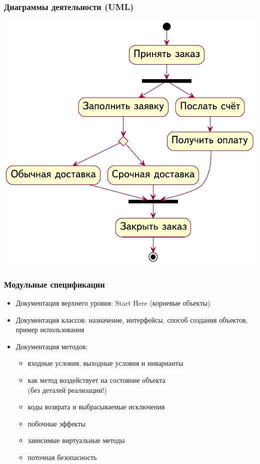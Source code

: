 \documentclass{softengineering-lectures}
\begin{document}
\begin{frame} \frametitle{Диаграммы деятельности (UML)}

  \centerline{\includegraphics[height=0.9\textheight]{activity.pdf}}

\end{frame}

\begin{frame} \frametitle{Модульные спецификации}
  \begin{itemize}
  \item Документация верхнего уровня: Start Here (корневые объекты)
  \item Документация классов: назначение, интерфейсы, способ создания объектов,
    пример использования
  \item Документация методов:
    \begin{itemize}
    \item входные условия, выходные условия и инварианты
    \item как метод воздействует на состояние объекта\\ (без деталей реализации!)
    \item коды возврата и выбрасываемые исключения
    \item побочные эффекты
    \item зависимые виртуальные методы
    \item поточная безопасность
    \end{itemize}
  \end{itemize}
\end{frame}
\end{document}

